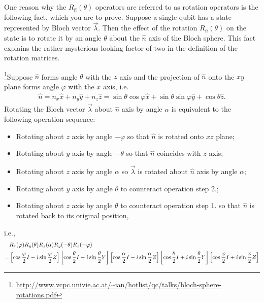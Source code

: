\documentclass[en]{sol-man}
\begin{document}
\begin{exe}
    One reason why the $R_{\hat{n}}(\theta)$ operators are referred to as rotation operators is the following fact, which you are to prove. Suppose a single qubit has a state represented by Bloch vector $\vec{\lambda}$. Then the effect of the rotation $R_{\hat{n}}(\theta)$ on the state is to rotate it by an angle $\theta$ about the $\hat{n}$ axis of the Bloch sphere. This fact explains the rather mysterious looking factor of two in the definition of the rotation matrices.
\end{exe}
\begin{pf}
    \footnote{\url{http://www.vcpc.univie.ac.at/~ian/hotlist/qc/talks/bloch-sphere-rotations.pdf}}Suppose $\hat{n}$ forms angle $\theta$ with the $z$ axis and the projection of $\hat{n}$ onto the $xy$ plane forms angle $\varphi$ with the $x$ axis, i.e.
    \begin{align}
        \label{E4.8}
        \hat{n}=n_x\hat{x}+n_y\hat{y}+n_z\hat{z}=\sin\theta\cos\varphi\hat{x}+\sin\theta\sin\varphi\hat{y}+\cos\theta\hat{z}.
    \end{align}
    Rotating the Bloch vector $\vec{\lambda}$ about $\hat{n}$ axis by angle $\alpha$ is equivalent to the following operation sequence:
    \begin{itemize}
        \item[1.] Rotating about $z$ axis by angle $-\varphi$ so that $\hat{n}$ is rotated onto $xz$ plane;
        \item[2.] Rotating about $y$ axis by angle $-\theta$ so that $\hat{n}$ coincides with $z$ axis;
        \item[3.] Rotating about $z$ axis by angle $\alpha$ so $\vec{\lambda}$ is rotated about $\hat{n}$ axis by angle $\alpha$;
        \item[4.] Rotating about $y$ axis by angle $\theta$ to counteract operation step 2.;
        \item[5.] Rotating about $z$ axis by angle $\theta$ to counteract operation step 1. so that $\hat{n}$ is rotated back to its original position,
    \end{itemize}
    i.e.,
    \begin{align}
        \notag&R_z(\varphi)R_y(\theta)R_z(\alpha)R_y(-\theta)R_z(-\varphi)\\
        \notag=&\left[\cos\frac{\varphi}{2}I-i\sin\frac{\varphi}{2}Z\right]\left[\cos\frac{\theta}{2}I-i\sin\frac{\theta}{2}Y\right]\left[\cos\frac{\alpha}{2}I-i\sin\frac{\alpha}{2}Z\right]\left[\cos\frac{\theta}{2}I+i\sin\frac{\theta}{2}Y\right]\left[\cos\frac{\varphi}{2}I+i\sin\frac{\varphi}{2}Z\right]\\

\end{align}
\end{pf}
\end{document}
